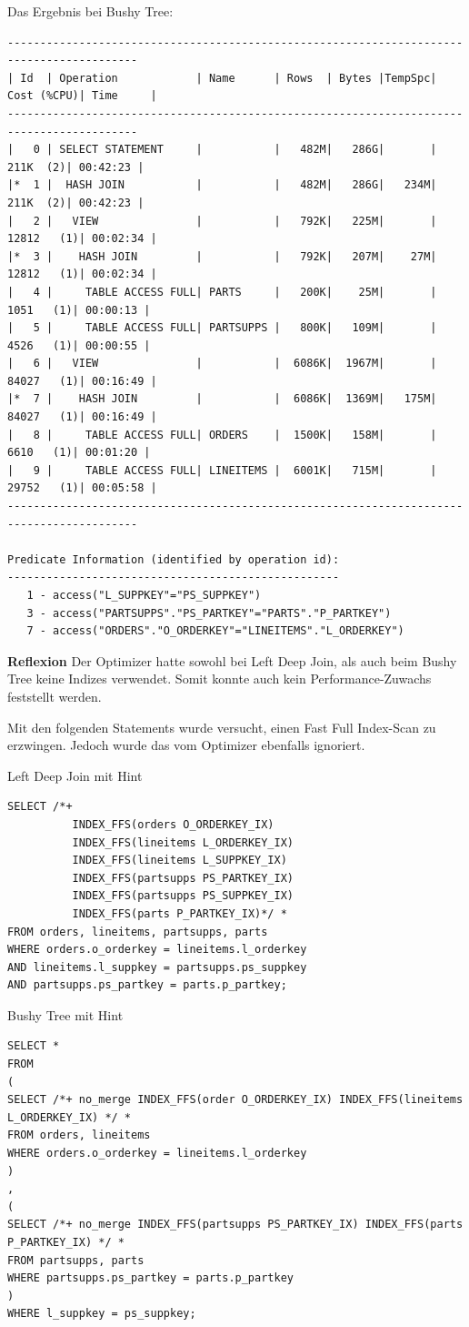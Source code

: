 \documentclass[10pt]{article}
\begin{document}
Das Ergebnis bei Bushy Tree:
\begin{lstlisting}[style=queryexecutionplan]
------------------------------------------------------------------------------------------
| Id  | Operation            | Name      | Rows  | Bytes |TempSpc| Cost (%CPU)| Time     |
------------------------------------------------------------------------------------------
|   0 | SELECT STATEMENT     |           |   482M|   286G|       |   211K  (2)| 00:42:23 |
|*  1 |  HASH JOIN           |           |   482M|   286G|   234M|   211K  (2)| 00:42:23 |
|   2 |   VIEW               |           |   792K|   225M|       | 12812   (1)| 00:02:34 |
|*  3 |    HASH JOIN         |           |   792K|   207M|    27M| 12812   (1)| 00:02:34 |
|   4 |     TABLE ACCESS FULL| PARTS     |   200K|    25M|       |  1051   (1)| 00:00:13 |
|   5 |     TABLE ACCESS FULL| PARTSUPPS |   800K|   109M|       |  4526   (1)| 00:00:55 |
|   6 |   VIEW               |           |  6086K|  1967M|       | 84027   (1)| 00:16:49 |
|*  7 |    HASH JOIN         |           |  6086K|  1369M|   175M| 84027   (1)| 00:16:49 |
|   8 |     TABLE ACCESS FULL| ORDERS    |  1500K|   158M|       |  6610   (1)| 00:01:20 |
|   9 |     TABLE ACCESS FULL| LINEITEMS |  6001K|   715M|       | 29752   (1)| 00:05:58 |
------------------------------------------------------------------------------------------
 
Predicate Information (identified by operation id):
---------------------------------------------------
   1 - access("L_SUPPKEY"="PS_SUPPKEY")
   3 - access("PARTSUPPS"."PS_PARTKEY"="PARTS"."P_PARTKEY")
   7 - access("ORDERS"."O_ORDERKEY"="LINEITEMS"."L_ORDERKEY")
\end{lstlisting}
\textbf{Reflexion} \newline
Der Optimizer hatte sowohl bei Left Deep Join, als auch beim Bushy Tree keine Indizes verwendet.
Somit konnte auch kein Performance-Zuwachs feststellt werden.

\newpage
Mit den folgenden Statements wurde versucht, einen Fast Full Index-Scan zu erzwingen. Jedoch wurde das vom Optimizer ebenfalls ignoriert.

Left Deep Join mit Hint
\begin{lstlisting}[style=sql]
SELECT /*+ 
          INDEX_FFS(orders O_ORDERKEY_IX) 
          INDEX_FFS(lineitems L_ORDERKEY_IX) 
          INDEX_FFS(lineitems L_SUPPKEY_IX) 
          INDEX_FFS(partsupps PS_PARTKEY_IX) 
          INDEX_FFS(partsupps PS_SUPPKEY_IX) 
          INDEX_FFS(parts P_PARTKEY_IX)*/ *
FROM orders, lineitems, partsupps, parts
WHERE orders.o_orderkey = lineitems.l_orderkey
AND lineitems.l_suppkey = partsupps.ps_suppkey
AND partsupps.ps_partkey = parts.p_partkey;
\end{lstlisting}
Bushy Tree mit Hint
\begin{lstlisting}[style=sql]
SELECT *
FROM 
(
SELECT /*+ no_merge INDEX_FFS(order O_ORDERKEY_IX) INDEX_FFS(lineitems L_ORDERKEY_IX) */ *
FROM orders, lineitems
WHERE orders.o_orderkey = lineitems.l_orderkey
)
,
(
SELECT /*+ no_merge INDEX_FFS(partsupps PS_PARTKEY_IX) INDEX_FFS(parts P_PARTKEY_IX) */ *
FROM partsupps, parts
WHERE partsupps.ps_partkey = parts.p_partkey
)
WHERE l_suppkey = ps_suppkey;
\end{lstlisting}
\end{document}
